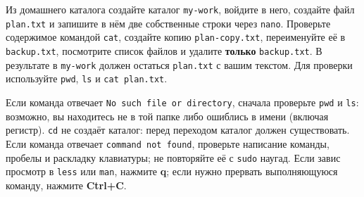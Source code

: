 Из домашнего каталога создайте каталог \texttt{my-work}, войдите в него,
создайте файл \texttt{plan.txt} и запишите в нём две собственные строки
через \texttt{nano}. Проверьте содержимое командой \texttt{cat},
создайте копию \texttt{plan-copy.txt}, переименуйте её в
\texttt{backup.txt}, посмотрите список файлов и удалите \textbf{только}
\texttt{backup.txt}. В результате в \texttt{my-work} должен остаться
\texttt{plan.txt} с вашим текстом. Для проверки используйте
\texttt{pwd}, \texttt{ls} и \texttt{cat\ plan.txt}.

Если команда отвечает \texttt{No\ such\ file\ or\ directory}, сначала
проверьте \texttt{pwd} и \texttt{ls}: возможно, вы находитесь не в той
папке либо ошиблись в имени (включая регистр). \texttt{cd} не создаёт
каталог: перед переходом каталог должен существовать. Если команда
отвечает \texttt{command\ not\ found}, проверьте написание команды,
пробелы и раскладку клавиатуры; не повторяйте её с \texttt{sudo} наугад.
Если завис просмотр в \texttt{less} или \texttt{man}, нажмите
\textbf{q}; если нужно прервать выполняющуюся команду, нажмите
\textbf{Ctrl+C}.
